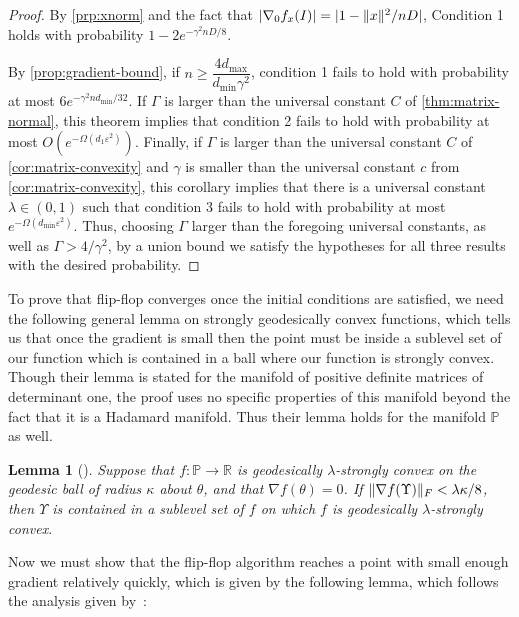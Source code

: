 \documentclass[aos]{imsart}
\newtheorem{lemma}[theorem]{Lemma}
\theoremstyle{definition}
\numberwithin{equation}{section}
\DeclarePairedDelimiter{\norm}{\lVert}{\rVert}
\newcommand{\R}{{\mathbb{R}}}
\newcommand{\SPD}{\mathbb{P}}
\def\dmin{d_{\min}}
\def\dmax{d_{\max}}
\begin{document}
\begin{proof}
By \cref{prp:xnorm} and the fact that $|\nabla_0 f_x(I)| = |1 - \norm{x}^2/nD|$, Condition 1 holds with probability $1 - 2e^{-\gamma^2 nD/8}$.

By \cref{prop:gradient-bound}, if $n \geq \dfrac{4\dmax}{\dmin \gamma^2}$, condition 1 fails to hold with probability at most $6e^{-\gamma^2n\dmin/32}$.
If $\Gamma$ is larger than the universal constant $C$ of \cref{thm:matrix-normal}, this theorem implies that condition 2 fails to hold with probability at most $O(e^{-\Omega(d_1 \varepsilon^2)})$.
Finally, if $\Gamma$ is larger than the universal constant $C$ of \cref{cor:matrix-convexity} and $\gamma$ is smaller than the universal constant $c$ from \cref{cor:matrix-convexity}, this corollary implies that there is a universal constant $\lambda \in (0,1)$ such that condition 3 fails to hold with probability at most $e^{-\Omega(\dmin \varepsilon^2)}$.
Thus, choosing $\Gamma$ larger than the foregoing universal constants, as well as $\Gamma > 4/\gamma^2$, by a union bound we satisfy the hypotheses for all three results with the desired probability.
\end{proof}



To prove that flip-flop converges once the initial conditions are satisfied, we need the following general lemma \cite[Lemma 4.7]{FM20} on strongly geodesically convex functions, which tells us that once the gradient is small then the point must be inside a sublevel set of our function which is contained in a ball where our function is strongly convex. Though their lemma is stated for the manifold of positive definite matrices of determinant one, the proof uses no specific properties of this manifold beyond the fact that it is a Hadamard manifold. Thus their lemma holds for the manifold $\SPD$ as well.

\begin{lemma}[\cite{FM20}]\label{lem:gradient-strong-convexity-fm}
Suppose that $f : \SPD \to \R$ is geodesically $\lambda$-strongly convex on the geodesic ball of radius $\kappa$ about $\theta$, and that $\nabla f(\theta) = 0$.
If $\norm{\nabla f(\Upsilon)}_F < \lambda \kappa/8$, then $\Upsilon$ is contained in a sublevel set of $f$ on which $f$ is geodesically $\lambda$-strongly convex.
\end{lemma}
Now we must show that the flip-flop algorithm reaches a point with small enough gradient relatively quickly, which is given by the following lemma, which follows the analysis given by~\cite{GGOW19}:
\end{document}
